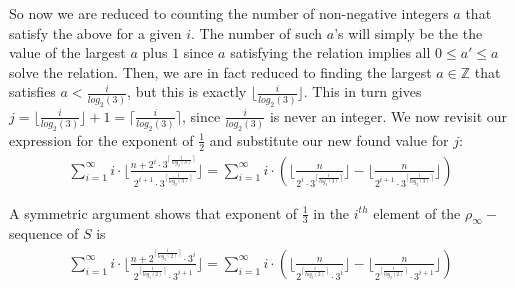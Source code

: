 So now we are reduced to counting the number of non-negative integers $a$ that satisfy the above for a given $i$.  The number of such $a$'s will simply be the the value of the largest $a$ plus $1$ since $a$ satisfying the relation implies all $0 \leq a' \leq a$ solve the relation. Then, we are in fact reduced to finding the largest $a \in \mathbb{Z}$ that satisfies $a < \frac{i}{log_2(3)}$, but this is exactly $\lfloor \frac{i}{log_2(3)}\rfloor$. This in turn gives $j =  \lfloor \frac{i}{log_2(3)}\rfloor + 1= \lceil \frac{i}{log_2(3)}\rceil$, since $\frac{i}{log_2(3)}$ is never an integer. We now revisit our expression for the exponent of $\frac{1}{2}$ and substitute our new found value for $j$:\\

\begin{align} 
\sum_{i=1}^\infty i \cdot \lfloor\frac{n + 2^i \cdot 3^{\lceil \frac{i}{log_2(3)}\rceil}}{2^{i+1}\cdot 3^{\lceil \frac{i}{log_2(3)}\rceil}} \rfloor
=\sum_{i=1}^\infty i \cdot (\lfloor\frac{n}{2^i \cdot 3^{\lceil \frac{i}{log_2(3)}\rceil }}\rfloor -  \lfloor\frac{n}{2^{i+1}\cdot 3^{\lceil \frac{i}{log_2(3)}\rceil}} \rfloor)
\end{align}




A symmetric argument shows that exponent of $\frac{1}{3}$ in the $i^{th}$ element of the $\rho_\infty-$sequence of $S$ is\\ 

\begin{align} 
\sum_{i=1}^\infty i \cdot \lfloor\frac{n + 2^{\lceil \frac{i}{log_3(2)}\rceil} \cdot 3^i}{2^{\lceil \frac{i}{log_3(2)}\rceil}\cdot 3^{i+1}} \rfloor
=\sum_{i=1}^\infty i \cdot (\lfloor\frac{n}{2^{\lceil \frac{i}{log_3(2)}\rceil } \cdot 3^i}\rfloor -  \lfloor\frac{n}{2^{\lceil \frac{i}{log_3(2)}\rceil}\cdot 3^{i+1}} \rfloor)
\end{align}

